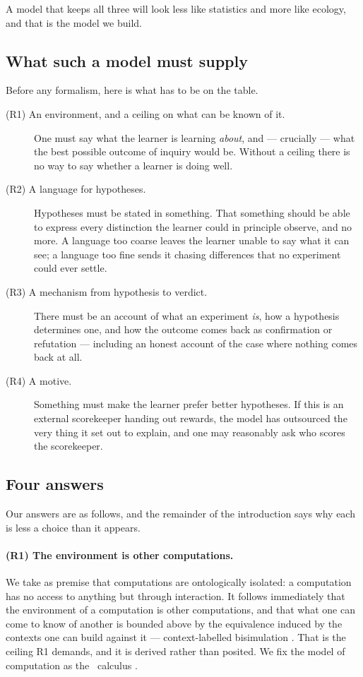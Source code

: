 A model that keeps all three will look less like statistics and more like ecology, and that is the
model we build.

\subsection{What such a model must supply}\label{sci:S1.2}
\label{sci:sec:requirements}

Before any formalism, here is what has to be on the table.

\begin{description}
\item[\textnormal{(R1)} An environment, and a ceiling on what can be known of it.] One must say what
the learner is learning \emph{about}, and --- crucially --- what the best possible outcome of inquiry
would be. Without a ceiling there is no way to say whether a learner is doing well.
\item[\textnormal{(R2)} A language for hypotheses.] Hypotheses must be stated in something. That
something should be able to express every distinction the learner could in principle observe, and no
more. A language too coarse leaves the learner unable to say what it can see; a language too fine
sends it chasing differences that no experiment could ever settle.
\item[\textnormal{(R3)} A mechanism from hypothesis to verdict.] There must be an account of what an
experiment \emph{is}, how a hypothesis determines one, and how the outcome comes back as confirmation
or refutation --- including an honest account of the case where nothing comes back at all.
\item[\textnormal{(R4)} A motive.] Something must make the learner prefer better hypotheses. If this
is an external scorekeeper handing out rewards, the model has outsourced the very thing it set out to
explain, and one may reasonably ask who scores the scorekeeper.
\end{description}

\subsection{Four answers}\label{sci:S1.3}

Our answers are as follows, and the remainder of the introduction says why each is less a choice than
it appears.

\paragraph{(R1) The environment is other computations.} We take as premise that computations are
ontologically isolated: a computation has no access to anything but through interaction. It follows
immediately that the environment of a computation is other computations, and that what one can come to
know of another is bounded above by the equivalence induced by the contexts one can build against it
--- context-labelled bisimulation \cite{Probing}. That is the ceiling R1 demands, and it is derived
rather than posited. We fix the model of computation as the \rhoc\ calculus \cite{RHO}.

